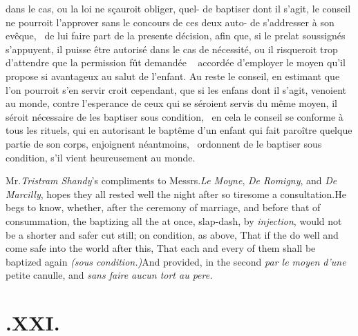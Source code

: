 \documentclass[twoside]{article}
\begin{document}
dans le cas, ou la loi ne sçauroit obliger, quel-\break
{}\break
de baptiser dont il s’agit, le conseil ne pourroit\break
l’approver sans le concours de ces deux auto-\break
{}\break
de s’addresser à son evêque, \et\ de lui faire part\break
de la presente décision, afin que, si le prelat\break
{}\break
soussignés s’appuyent, il puisse être autorisé\break
dans le cas de nécessité, ou il risqueroit trop\break
d'attendre que la permission fût demandée \et\ \break
accordée d’employer le moyen qu’il propose si\break
avantageux au salut de l’enfant. Au reste\break
le conseil, en estimant que l’on pourroit s’en\break
servir croit cependant, que si les enfans dont\break
il s’agit, venoient au monde, contre l’esperance
de ceux qui se séroient servis du même moyen, il séroit nécessaire de
les baptiser \textnormal{sous cond\-ition,} \et\ en cela le conseil se conforme à
tous les rituels, qui en autorisant le baptême d’un enfant qui fait paroître quelque
partie de son corps, enjoignent néantmoins, \et\ ordonnent de le baptiser
\textnormal{sous condition}, s’il vient heu\-reusement au monde. 
\egroup 

\noindent
{}

\bigskip

\vbox{}

\bigskip

Mr.\@ \textit{Tristram Shandy}’s compliments to Messrs.\@ \textit{Le
Moyne}, \textit{De Romigny}, and \textit{De Marcilly}, hopes they all
rested well the night after so tiresome a consultation.\tsk\break He
begs to know, whether, after the ce\-remony of marriage, and before
that of
consummation, the baptizing all the
 at once, slap-dash, by \textit{injection},
would not be a shorter and safer cut still; on condition, as above,
That if the  do well and come safe into
the world after this, That each and every of them shall be baptized
again \textit{(sous con\-dition.)}\tsh And provided, in the
second\break
{}
\textit{par le moyen d’une} petite canulle, and\break 
\textit{sans faire aucun tort au pere.}

\section{\chapstrut{}.\enspace XXI.}
\end{document}
